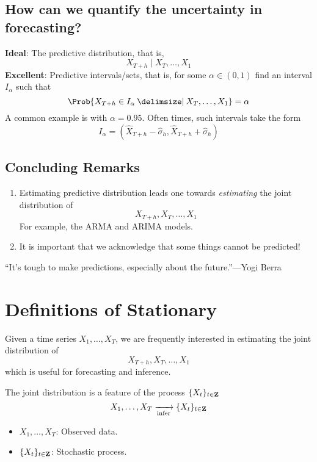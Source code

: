 \subsection*{How can we quantify the uncertainty in forecasting?}
\textbf{Ideal}: The predictive distribution, that is,
\[ X_{T+h}\mid X_T,\ldots,X_1 \]
\textbf{Excellent}: Predictive intervals/sets, that is, for some $ \alpha\in(0,1) $
find an interval $ I_\alpha $ such that
\[ \Prob{X_{T+h}\in I_\alpha\given X_T,\ldots,X_1}=\alpha \]
A common example is with $ \alpha=0.95 $. Often times, such intervals take the form
\[ I_\alpha=(\hat{X}_{T+h}-\hat{\sigma}_h,\hat{X}_{T+h}+\hat{\sigma}_h) \]
\subsection*{Concluding Remarks}
\begin{enumerate}
    \item Estimating predictive distribution leads one towards
          \emph{estimating} the joint distribution of
          \[ X_{T+h},X_T,\ldots,X_1 \]
          For example, the ARMA and ARIMA models.
    \item It is important that we acknowledge that some things cannot be predicted!
\end{enumerate}
``It's tough to make predictions, especially about the future.''---Yogi Berra

\section{Definitions of Stationary}
Given a time series $ X_1,\ldots,X_T $, we are
frequently interested in estimating the joint distribution of
\[ X_{T+h},X_T,\ldots,X_1 \]
which is useful for forecasting and inference.

The joint distribution is a feature of the process
$ \{X_{t}\}_{t\in\mathbf{Z}} $
\[ X_1,\ldots,X_T\xrightarrow[\text{infer}]{}\{X_t\}_{t\in\mathbf{Z}} \]
\begin{itemize}
    \item $ X_1,\ldots,X_T $: Observed data.
    \item $ \{X_t\}_{t\in\mathbf{Z}} $: Stochastic process.
\end{itemize}

